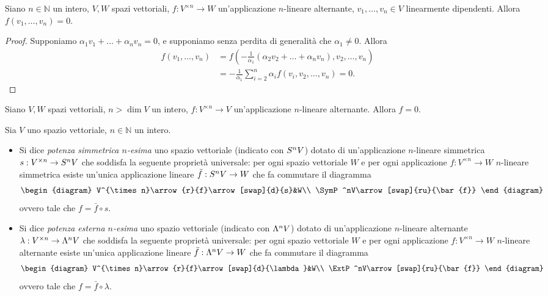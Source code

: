 \begin{proposition}
Siano $n\in\mathbb{N}$ un intero, $V\comma W$ spazi vettoriali, $f:V^{\times n}\to W$ un'applicazione $n$-lineare alternante, $v_1,\ldots,v_n\in V$ linearmente dipendenti. Allora $f(v_1,\ldots,v_n)=0$.
\end{proposition}
\begin{proof}
Supponiamo $\alpha_1v_1+\ldots+\alpha_nv_n=0$, e supponiamo senza perdita di generalità che $\alpha_1\neq 0$. Allora
\begin{align*}
f(v_1,\ldots,v_n)&=f\left(-\frac{1}{\alpha_1}(\alpha_2v_2+\ldots+\alpha_nv_n),v_2,\ldots,v_n\right)\\
&=-\frac{1}{\alpha_1}\sum_{i=2}^{n}\alpha_if(v_i,v_2,\ldots,v_n)=0.
\end{align*}
\end{proof}

\begin{corollary}
Siano $V\comma W$ spazi vettoriali, $n>\dim V$ un intero, $f:V^{\times n}\to V$ un'applicazione $n$-lineare alternante. Allora $f=0$.
\end{corollary}

\begin{definition}
Sia $V$ uno spazio vettoriale, $n\in\mathbb{N}$ un intero.
\begin{itemize}
\item Si dice \emph{potenza simmetrica $n$-esima} uno spazio vettoriale (indicato con $S^nV$) dotato di un'applicazione $n$-lineare simmetrica $s:V^{\times n}\to S^nV$ che soddisfa la seguente proprietà universale: per ogni spazio vettoriale $W$ e per ogni applicazione $f:V^{\times n}\to W$ $n$-lineare simmetrica esiste un'unica applicazione lineare $\bar{f}:S^nV\to W$ che fa commutare il diagramma
$$
\begin{diagram}
V^{\times n}\arrow{r}{f}\arrow[swap]{d}{s}&W\\
\SymP^nV\arrow[swap]{ru}{\bar{f}}
\end{diagram}
$$
ovvero tale che $f=\bar{f}\circ s$.
\item Si dice \emph{potenza esterna $n$-esima} uno spazio vettoriale (indicato con $\Lambda^nV$) dotato di un'applicazione $n$-lineare alternante $\lambda:V^{\times n}\to\Lambda^nV$ che soddisfa la seguente proprietà universale: per ogni spazio vettoriale $W$ e per ogni applicazione $f:V^{\times n}\to W$ $n$-lineare alternante esiste un'unica applicazione lineare $\bar{f}:\Lambda^nV\to W$ che fa commutare il diagramma
$$
\begin{diagram}
V^{\times n}\arrow{r}{f}\arrow[swap]{d}{\lambda}&W\\
\ExtP^nV\arrow[swap]{ru}{\bar{f}}
\end{diagram}
$$
ovvero tale che $f=\bar{f}\circ \lambda$.
\end{itemize}
\end{definition}

